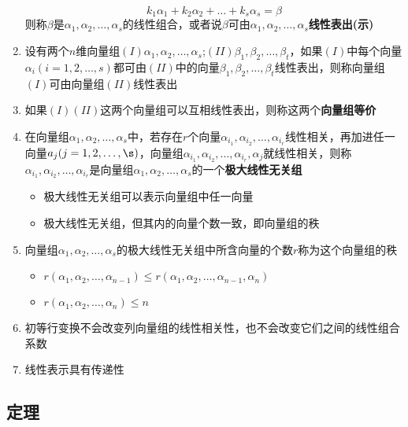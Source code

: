 \documentclass[a4paper,12pt]{article}
\begin{document}
\begin{enumerate}
        \[
            k_{1}\alpha_1 + k_{2}\alpha_2 + \dots + k_{s}\alpha_s = \beta
        \]
        则称$\beta$是$\alpha_1, \alpha_2, \dots, \alpha_s$的线性组合，或者说$\beta$可由$\alpha_1, \alpha_2, \dots, \alpha_s$\textbf{线性表出(示)}
        \item 设有两个$n$维向量组$(I)\alpha_1, \alpha_2, \dots, \alpha_s$;$(II)\beta_1, \beta_2, \dots, \beta_t$，如果$(I)$中每个向量$\alpha_i(i = 1,2,\dots,s)$都可由$(II)$中的向量$\beta_1, \beta_2, \dots, \beta_t$线性表出，则称向量组$(I)$可由向量组$(II)$线性表出
        \item 如果$(I)(II)$这两个向量组可以互相线性表出，则称这两个\textbf{向量组等价}
        \item 在向量组$\alpha_1, \alpha_2, \dots, \alpha_s$中，若存在$r$个向量$\alpha_{i_1}, \alpha_{i_2}, \dots, \alpha_{i_r}$线性相关，再加进任一向量$a_j(j = 1,2,\dots,\s)$，向量组$\alpha_{i_1}, \alpha_{i_2}, \dots, \alpha_{i_r}, \alpha_j$就线性相关，则称$\alpha_{i_1}, \alpha_{i_2}, \dots, \alpha_{i_r}$是向量组$\alpha_1, \alpha_2, \dots, \alpha_s$的一个\textbf{极大线性无关组}
        \begin{itemize}
            \item 极大线性无关组可以表示向量组中任一向量
            \item 极大线性无关组{\color[rgb]{0.2, 0.6, 0.3}{不唯一}}，但其内的向量个数一致，即向量组的秩
        \end{itemize}
        \item 向量组$\alpha_1, \alpha_2, \dots, \alpha_s$的极大线性无关组中所含向量的个数$r$称为这个向量组的秩
        \begin{itemize}
            \item $r(\alpha_1, \alpha_2, \dots, \alpha_{n-1}) \le r(\alpha_1, \alpha_2, \dots, \alpha_{n-1}, \alpha_n)$
            \item $r(\alpha_1, \alpha_2, \dots, \alpha_n) \le n$
        \end{itemize}
        \item 初等行变换不会改变列向量组的线性相关性，也不会改变它们之间的线性组合系数
        \item 线性表示具有传递性
    \end{enumerate}

    \subsection{定理}
\end{document}
